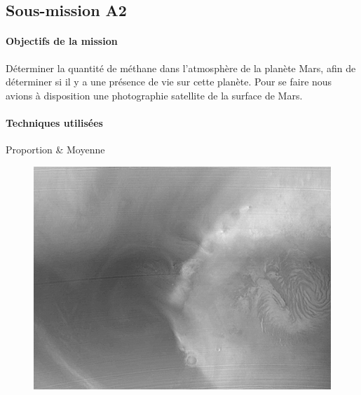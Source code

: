 \documentclass[12pt]{article}
\begin{document}
	
	
	\subsection{Sous-mission A2}

	\begin{vwcol}[widths={0.65,0.2}, rule=0pt]
		\begin{minipage}{0.7\textwidth}
			\paragraph{Objectifs de la mission}

			Déterminer la quantité de méthane dans l'atmosphère de la planète Mars, afin de déterminer si il y a une présence de vie sur cette planète. Pour se faire nous avions à disposition une photographie satellite de la surface de Mars.
		\end{minipage}

		\begin{minipage}{0.3\textwidth}
			\begin{flushright}
				\paragraph{Techniques utilisées}
			
				Proportion \&
				Moyenne
			\end{flushright}
		\end{minipage}
	\end{vwcol} 

	\begin{figure}[h]
	\centering
		
		\includegraphics[scale=0.6]{images/Mars_surface.png}
		
	\end{figure}
	\vspace{-0.9cm}
\end{document}
